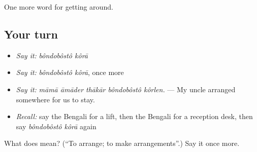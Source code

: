 \begin{grammarlens}[title={What you've built}]
One more word for getting around.
\end{grammarlens}

\subsection*{Your turn}
\begin{itemize}
\raggedright
  \item \emph{Say it:} \emph{bôndobôstô kôrā}
  \item \emph{Say it:} \emph{bôndobôstô kôrā}, once more
  \item \emph{Say it:} \emph{māmā āmāder thākār bôndobôstô kôrlen.} — My uncle arranged somewhere for us to stay.
  \item \emph{Recall:} say the Bengali for a lift, then the Bengali for a reception desk, then say \emph{bôndobôstô kôrā} again
\end{itemize}

\begin{tcolorbox}[breakable,colback=teal!4,colframe=teal!35!black,title={Before you move on}]
What does   mean? (\textquotedblleft{}To arrange; to make arrangements\textquotedblright{}.) Say it once more.
\end{tcolorbox}
